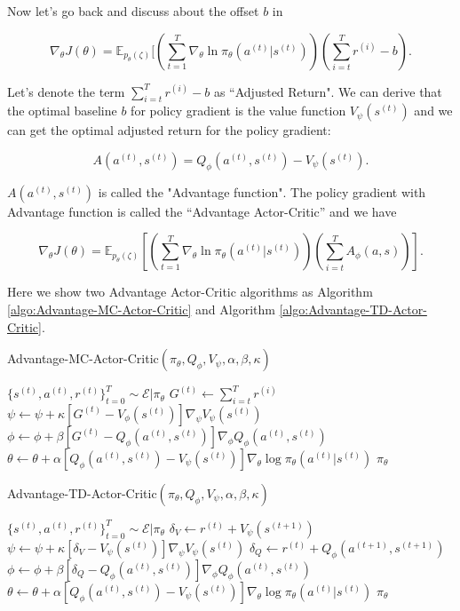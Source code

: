 \documentclass[11pt]{article}
\begin{document}
Now let's go back and discuss about the offset $b$ in 

$$\nabla_{\theta} J(\theta) = \mathbb{E}_{p_\theta(\zeta)}[(\sum_{t=1}^T \nabla_\theta \ln \pi_\theta(a^{(t)}|s^{(t)})) (\sum_{i=t}^T r^{(i)}-b).$$

Let's denote the term $\sum_{i=t}^T r^{(i)}-b$ as “Adjusted Return". We can derive that the optimal baseline $b$ for policy gradient is the value function $V_\psi(s^{(t)})$ and we can get the optimal adjusted return for the policy gradient:

$$A(a^{(t)},s^{(t)}) = Q_\phi(a^{(t)},s^{(t)}) - V_\psi(s^{(t)}).$$


$A(a^{(t)},s^{(t)})$ is called the "Advantage function". The policy gradient with Advantage function is called the “Advantage Actor-Critic” and we have

$$\nabla_{\theta} J(\theta) = \mathbb{E}_{p_\theta(\zeta)}[(\sum_{t=1}^T \nabla_\theta \ln \pi_\theta(a^{(t)}|s^{(t)})) (\sum_{i=t}^T A_\phi(a,s))].$$

Here we show two Advantage Actor-Critic algorithms as Algorithm \ref{algo:Advantage-MC-Actor-Critic}
 and Algorithm \ref{algo:Advantage-TD-Actor-Critic}.
\begin{algorithm}[H]
\caption{Advantage-MC-Actor-Critic$(\pi_\theta,Q_\phi,V_\psi, \alpha, \beta, \kappa)$}
\label{algo:Advantage-MC-Actor-Critic}
\begin{algorithmic}[1]
\STATE $\{s^{(t)},a^{(t)},r^{(t)}\}_{t=0}^T \sim \mathcal{E}|\pi_\theta $
\STATE $G^{(t)}\leftarrow \sum_{i=t}^T r^{(i)}$
\STATE $\psi \leftarrow \psi + \kappa[G^{(t)}-V_\phi(s^{(t)})]\nabla_\psi V_\psi(s^{(t)})$
\STATE $\phi \leftarrow \phi + \beta[G^{(t)}-Q_\phi(a^{(t)},s^{(t)})]\nabla_\phi Q_\phi(a^{(t)},s^{(t)})$
\STATE $\theta \leftarrow \theta+\alpha [Q_\phi(a^{(t)},s^{(t)})-V_\psi(s^{(t)})] \nabla_{\theta}\log{\pi_\theta(a^{(t)}|s^{(t)})}$
\ENDFOR
\ENDFOR 
\RETURN $\pi_\theta$
\end{algorithmic}
\end{algorithm}




\begin{algorithm}[H]
\caption{Advantage-TD-Actor-Critic$(\pi_\theta,Q_\phi,V_\psi, \alpha, \beta, \kappa)$}
\label{algo:Advantage-TD-Actor-Critic}
\begin{algorithmic}[1]
\STATE $\{s^{(t)},a^{(t)},r^{(t)}\}_{t=0}^T \sim \mathcal{E}|\pi_\theta $
\STATE $\delta_V \leftarrow r^{(t)} + V_\psi (s^{(t+1)})$
\STATE $\psi \leftarrow \psi + \kappa[\delta_V -V_\psi(s^{(t)})]\nabla_\psi V_\psi(s^{(t)})$
\STATE $\delta_Q \leftarrow r^{(t)} + Q_\phi (a^{(t+1)},s^{(t+1)})$
\STATE $\phi \leftarrow \phi + \beta[\delta_Q -Q_\phi(a^{(t)},s^{(t)})]\nabla_\phi Q_\phi(a^{(t)},s^{(t)})$
\STATE $\theta \leftarrow \theta+\alpha [Q_\phi(a^{(t)},s^{(t)})-V_\psi(s^{(t)})] \nabla_{\theta}\log{\pi_\theta(a^{(t)}|s^{(t)})}$
\ENDFOR
\ENDFOR 
\RETURN $\pi_\theta$
\end{algorithmic}
\end{algorithm}
\end{document}
